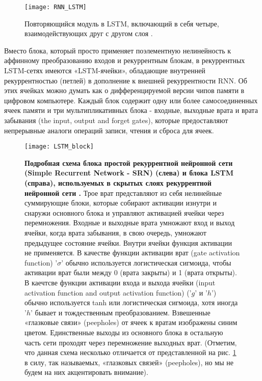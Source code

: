 \begin{figure}[h!]
    \centering
    \texttt{[image: RNN\_LSTM]}
    \caption{Повторяющийся модуль в LSTM, включающий 
    в себя четыре, взаимодействующих друг с другом слоя \cite{colah2}.}
    \label{fig:RNN_LSTM}
\end{figure}

Вместо блока, который просто применяет
поэлементную нелинейность к аффинному преобразованию входов и рекуррентным
блокам, в рекуррентных LSTM-сетях имеются «LSTM-ячейки», обладающие внут­ренней 
рекуррентностью (петлей) в дополнение к внешней рекуррентности RNN.
Об этих ячейках можно думать как о дифференцируемой версии чипов памяти в 
цифровом компьютере. Каждый блок содержит одну или более самосоединенных 
ячеек памяти и три мультипликативных блока - 
входные, выходные врата и врата забывания 
(the input, output and forget gates), которые предоставляют 
непрерывные аналоги операций записи, чтения и сброса для ячеек.

\begin{figure}[h!]
    \centering
    \texttt{[image: LSTM\_block]}
    \caption{\textbf{Подробная схема блока простой рекуррентной нейронной сети 
    (Simple Recurrent Network - SRN) (слева) и блока LSTM (справа), 
    используемых в скрытых слоях рекуррентной нейронной сети \cite{greff2017lstm}.}
    Трое врат представляют из себя нелинейные суммирующие блоки, которые 
    собирают активации изнутри и снаружи основного блока и 
    управляют активацией ячейки через перемножения. Входные и выходные врата 
    умножают вход и выход ячейки, когда врата забывания, в свою очередь, 
    умножают предыдущее состояние ячейки. Внутри ячейки функция активации не 
    применяется. В качестве функции активации врат (gate activation function) 
    '$\sigma$' обычно используется логистическая сигмоида, чтобы 
    активации врат были между 0 (врата закрыты) и 1 (врата открыты). 
    В каечтсве функции активации входа и выхода ячейки (input activation function and 
    output activation function) ('$g$' и '$h$') обычно используется tanh 
    или логистическая сигмоида, хотя иногда '$h$' бывает и тождественным 
    преобразованием. Взвешенные «глазковые связи» (peepholes) от 
    ячеек к вратам изображены синим цветом. Единственные выходы из основного 
    блока в остальную часть сети проходят через перемножение выходных врат. 
    (Отметим, что данная схема несколько отличается от представленной 
    на рис. \ref{fig:RNN_LSTM} в силу, так называемых, «глазковых связей» 
    (peepholes), но мы не будем на них акцентировать внимание).}
    \label{fig:LSTM_block}
\end{figure}

